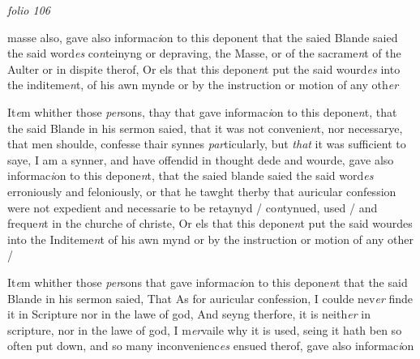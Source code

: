 \documentclass[12pt, a4paper]{book}
\begin{document}

\textit{folio 106}


 	
 		
		\ifthenelse{\isodd{\thepage}}
		{\reversemarginpar}
		{\normalmarginpar}
		masse also, gave also informac\textit{i}on to this deponent
 			that the saied Blande saied the said word\textit{es} co\textit{n}teinyng
 or depraving, the Masse, or of the sacrame\textit{n}t of the Aulter
 or in dispite therof, Or els that this depone\textit{n}t put
 the said wourd\textit{es} into the inditeme\textit{n}t, of his awn mynde
 or by the instruction or motion of any oth\textit{er}



				\marginpar[\vspace{0.5cm}{\textcolor{Gray}{5}}]{}
			
	
		\ifthenelse{\isodd{\thepage}}
		{\reversemarginpar}
		{\normalmarginpar}
		 It\textit{e}m whither those \textit{per}sons, thay that gave informac\textit{i}on to
		this depone\textit{n}t, that the said Blande in his sermon
 saied, that it was not convenie\textit{n}t, nor necessarye, that
 men shoulde, confesse thair synnes \textit{par}ticularly, but \textit{that}
 it was sufficient to saye, I am a synner, and have
 offendid in thought dede and wourde, gave also informac\textit{i}on
		to this depone\textit{n}t, that the saied blande saied the said word\textit{es}
 erroniously and feloniously, or that he tawght therby
 that auricular confession were not expedient and
 necessarie to be retaynyd / co\textit{n}tynued, used / and freque\textit{n}t
 in the churche of christe, Or els that this depone\textit{n}t
 put the said wourdes into the Inditeme\textit{n}t of his awn mynd
 or by the instruction or motion of any other /





				\marginpar[\vspace{0.5cm}{\textcolor{Gray}{6}}]{}
			
	
		\ifthenelse{\isodd{\thepage}}
		{\reversemarginpar}
		{\normalmarginpar}
		 It\textit{e}m whither those \textit{per}sons that gave informac\textit{i}on to this depone\textit{n}t
		that the said Blande in his sermon saied, That As for
 auricular confession, I coulde nev\textit{er} finde it in Scripture
 nor in the lawe of god, And seyng therfore, it is neith\textit{er}
 in scripture, nor in the lawe of god, I m\textit{er}vaile why it
 is used, seing it hath ben so often put down, and so many
 inconvenienc\textit{es} ensued therof, gave also informac\textit{i}on
\end{document}

